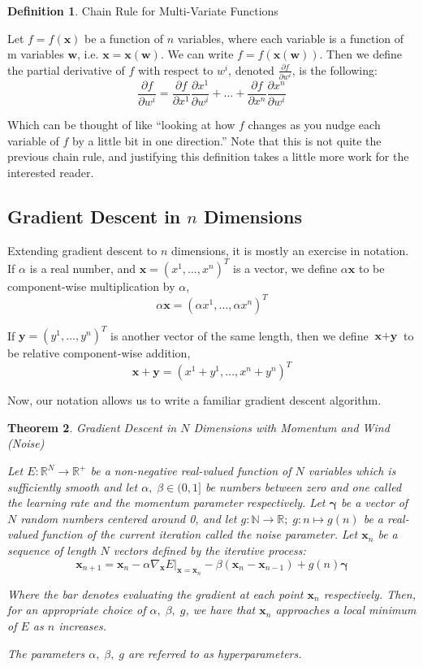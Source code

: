 \documentclass[a4paper]{article}
\theoremstyle{plain} %
\newtheorem{theorem}{Theorem}[section]
\theoremstyle{definition} %
\newtheorem{definition}[theorem]{Definition}
\numberwithin{equation}{subsection}
\newcommand{\R}{\mathbb{R}}
\newcommand{\N}{\mathbb{N}}
\newcommand{\del}[2]{\frac{\partial #1}{\partial #2}}
\newcommand{\vx}{{\textbf{x}}}
\newcommand{\vy}{{\textbf{y}}}
\begin{document}
\begin{definition} \label{def:chain-rule-total-derivative}
  Chain Rule for Multi-Variate Functions

  Let $f = f(\vx)$ be a function of $n$ variables, where each variable is a function of m variables $\textbf{w}$, i.e. $\vx = \vx(\textbf{w})$. 
  We can write $f = f(\vx(\textbf{w}))$. Then we define the partial derivative of $f$ with respect to $w^i$, denoted $\del{f}{w^i}$, is the following:
  \[ \del{f}{w^i} = \del{f}{x^1} \del{x^1}{w^i} + \dots + \del{f}{x^n} \del{x^n}{w^i}\]
\end{definition}

Which can be thought of like ``looking at how $f$ changes as you nudge each variable of $f$ by a little bit in one direction.'' Note that this is not quite the previous chain rule, and justifying this definition takes a little more work for the interested reader.

\subsection{Gradient Descent in $n$ Dimensions}

Extending gradient descent to $n$ dimensions, it is mostly an exercise in notation. If $\alpha$ is a real number, and 
$\vx = (x^1,\dots,x^n)^T$ is a vector, we define $\alpha \vx$ to be component-wise multiplication by $\alpha$, 
\[\alpha \vx = (\alpha x^1,\dots,\alpha x^n)^T\]

If $\vy = (y^1, \dots, y^n)^T$ is another vector of the same length, then we define $\vx + \vy$ to be relative component-wise addition,
\[\vx + \vy = (x^1 + y^1, \dots,x^n + y^n)^T\]

Now, our notation allows us to write a familiar gradient descent algorithm.

\begin{theorem} \label{th:gradient-descent-nd-mom-wind}
  Gradient Descent in $N$ Dimensions with Momentum and Wind (Noise)
  
  Let $E:\R^{N} \rightarrow \R^+$ be a non-negative real-valued function of $N$ variables which is sufficiently smooth
  and let $\alpha, \; \beta \in (0,1]$ be numbers between zero and one called the learning rate and the momentum parameter respectively. 
  Let $\boldsymbol{\gamma}$ be a vector of $N$ random numbers centered around 0, and let 
  $g: \N \rightarrow \R; \; g: n \mapsto g(n)$ be a real-valued function of 
  the current iteration called the noise parameter.
  Let $\vx_n$ be a sequence of length $N$ vectors defined by the iterative process:
  \[ \vx_{n+1} = \vx_n - \alpha \nabla_\vx E \big|_{\vx = \vx_n} - \beta (\vx_{n} - \vx_{n-1}) + g(n)\boldsymbol{\gamma} \]

  Where the bar denotes evaluating the gradient at each point $\vx_n$ respectively. Then, for an appropriate choice of $\alpha, \; \beta, \; g$,
  we have that $\vx_n$ approaches a local minimum of $E$ as $n$ increases.

  The parameters $\alpha, \; \beta, \; g$ are referred to as hyperparameters.
\end{theorem}
\end{document}

